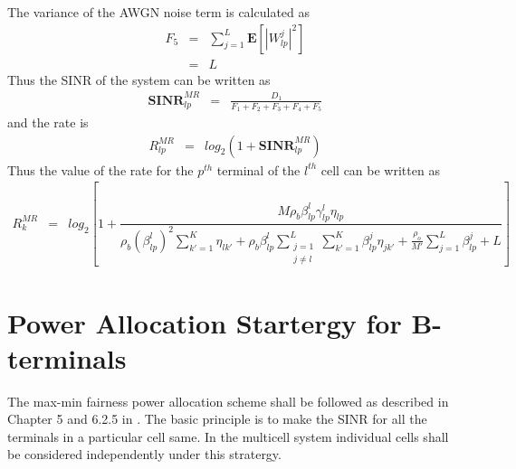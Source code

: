 \documentclass[10pt, a4paper, twoside,fleqn]{article}
\begin{document}
The variance of the AWGN noise term is calculated as 
\begin{eqnarray}\label{eqn:noiseF5}
	F_5 &=& \sum_{j=1}^{L} \pmb{E}\left[|W_{lp}^{j}|^2\right] \nonumber \\
            &=& L
\end{eqnarray}
Thus the SINR of the system can be written as 
\begin{eqnarray}\label{eqn:sinrexp}
	\pmb{SINR}_{lp}^{MR} &=& \frac{D_1}{F_1+F_2+F_3+F_4+F_5}
\end{eqnarray}
and the rate is 
\begin{eqnarray}\label{eqn:rateexp}
	R_{lp}^{MR} &=& log_2(1+\pmb{SINR}_{lp}^{MR})
\end{eqnarray}
Thus the value of the rate for the $p^{th}$ terminal of the $l^{th}$ cell can be written as
\begin{eqnarray}\label{eqn:rateot}
	R_k^{MR} &=& log_2\left[1+ \dfrac{M\rho_b\beta_{lp}^{l}\gamma_{lp}^{l}\eta_{lp}}
                                         {\rho_b(\beta_{lp}^{l})^2\sum\limits_{k' = 1}^{K}\eta_{lk'}
                                                   +\rho_b\beta_{lp}^{l} \sum\limits_{\substack{j=1 \\ j \neq l}}^{L} \sum\limits_{k' = 1}^{K}\beta^{j}_{lp}\eta_{jk'}
						   +\frac{\rho_o}{M'} \sum\limits_{j=1}^{L}\beta_{lp}^{j}
						   +L}\right]
\end{eqnarray}

\section{Power Allocation Startergy for B-terminals}
  The max-min fairness power allocation scheme shall be followed as described in Chapter 5 and 6.2.5 in \cite{bib:MassiveMimoBook}. The basic principle is to make the SINR for all the terminals in a particular cell same. In the multicell system individual cells shall be considered independently under this stratergy. 
\end{document}

